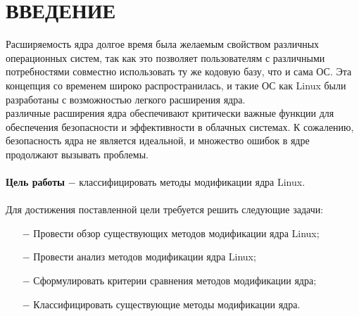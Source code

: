 \chapter*{ВВЕДЕНИЕ}

Расширяемость ядра долгое время была желаемым свойством различных операционных систем,
так как это позволяет пользователям с различными потребностями совместно использовать
ту же кодовую базу, что и сама ОС.
Эта концепция со временем широко распространилась, и такие ОС как Linux были разработаны с возможностью
легкого расширения ядра.
\\
 различные расширения ядра обеспечивают критически важные
функции для обеспечения безопасности и эффективности в облачных системах.
К сожалению, безопасность ядра не является идеальной, и множество ошибок в ядре продолжают вызывать проблемы\cite{bugs-pie}\cite{bugs-version}.
\\
\vspace{0.1cm}
\\
\textbf{Цель работы} $-$ классифицировать методы модификации ядра Linux.
\\
\vspace{0.1cm}
\\
Для достижения поставленной цели требуется решить следующие задачи:
\begin{itemize}
    \item[$-$] Провести обзор существующих методов модификации ядра Linux;
    \item[$-$] Провести анализ методов модификации ядра Linux;
    \item[$-$] Сформулировать критерии сравнения методов модификации ядра;
    \item[$-$] Классифицировать существующие методы модификации ядра.
\end{itemize}
